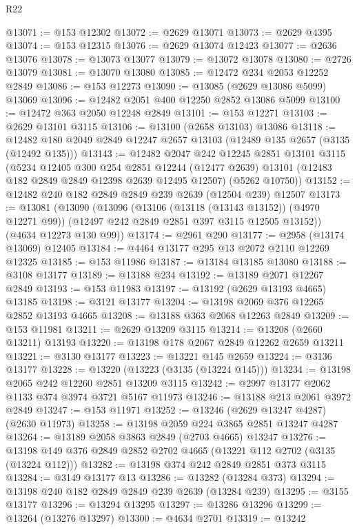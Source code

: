 \begin{lexlean}{R22}
\begin{coremodule}
@13071 := @153 @12302
@13072 := @2629 @13071
@13073 := @2629 @4395
@13074 := @153 @12315
@13076 := @2629 @13074 @12423
@13077 := @2636 @13076
@13078 := @13073 @13077
@13079 := @13072 @13078
@13080 := @2726 @13079
@13081 := @13070 @13080
@13085 := @12472 @234 @2053 @12252 @2849
@13086 := @153 @12273
@13090 := @13085 (@2629 @13086 @5099) @13069
@13096 := @12482 @2051 @400 @12250 @2852 @13086 @5099
@13100 := @12472 @363 @2050 @12248 @2849
@13101 := @153 @12271
@13103 := @2629 @13101 @3115
@13106 := @13100 (@2658 @13103) @13086
@13118 := @12482 @180 @2049 @2849 @12247 @2657 @13103 (@12489 @135 @2657 (@3135 (@12492 @135)))
@13143 := @12482
    @2047
    @242
    @12245
    @2851
    @13101
    @3115
    (@5234
      @12405
      @300
      @254
      @2851
      @12244
      (@12477 @2639)
      @13101
      (@12483 @182 @2849 @2849 @12398 @2639 @12495 @12507)
      (@5262 @10750))
@13152 := @12482 @240 @182 @2849 @2849 @239 @2639 (@12504 @239) @12507
@13173 := @13081
    (@13090
      (@13096
        (@13106 (@13118 (@13143 @13152)) (@4970 @12271 @99))
        (@12497 @242 @2849 @2851 @397 @3115 @12505 @13152))
      (@4634 @12273 @130 @99))
@13174 := @2961 @290
@13177 := @2958 (@13174 @13069) @12405
@13184 := @4464 @13177 @295 @13 @2072 @2110 @12269 @12325
@13185 := @153 @11986
@13187 := @13184 @13185 @13080
@13188 := @3108 @13177
@13189 := @13188 @234
@13192 := @13189 @2071 @12267 @2849
@13193 := @153 @11983
@13197 := @13192 (@2629 @13193 @4665) @13185
@13198 := @3121 @13177
@13204 := @13198 @2069 @376 @12265 @2852 @13193 @4665
@13208 := @13188 @363 @2068 @12263 @2849
@13209 := @153 @11981
@13211 := @2629 @13209 @3115
@13214 := @13208 (@2660 @13211) @13193
@13220 := @13198 @178 @2067 @2849 @12262 @2659 @13211
@13221 := @3130 @13177
@13223 := @13221 @145 @2659
@13224 := @3136 @13177
@13228 := @13220 (@13223 (@3135 (@13224 @145)))
@13234 := @13198 @2065 @242 @12260 @2851 @13209 @3115
@13242 := @2997 @13177 @2062 @1133 @374 @3974 @3721 @5167 @11973
@13246 := @13188 @213 @2061 @3972 @2849
@13247 := @153 @11971
@13252 := @13246 (@2629 @13247 @4287) (@2630 @11973)
@13258 := @13198 @2059 @224 @3865 @2851 @13247 @4287
@13264 := @13189 @2058 @3863 @2849 (@2703 @4665) @13247
@13276 := @13198 @149 @376 @2849 @2852 @2702 @4665 (@13221 @112 @2702 (@3135 (@13224 @112)))
@13282 := @13198 @374 @242 @2849 @2851 @373 @3115
@13284 := @3149 @13177 @13
@13286 := @13282 (@13284 @373)
@13294 := @13198 @240 @182 @2849 @2849 @239 @2639 (@13284 @239)
@13295 := @3155 @13177
@13296 := @13294 @13295
@13297 := @13286 @13296
@13299 := @13264 (@13276 @13297)
@13300 := @4634 @2701
@13319 := @13242

\end{coremodule}
\end{lexlean}
